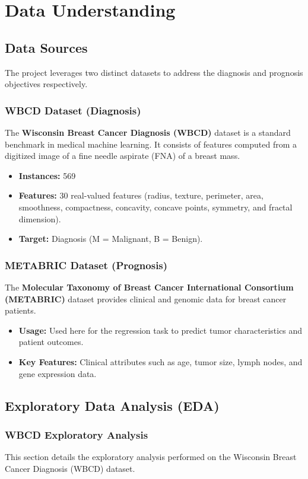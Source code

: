 \chapter{Data Understanding}

\section{Data Sources}
The project leverages two distinct datasets to address the diagnosis and prognosis objectives respectively.

\subsection{WBCD Dataset (Diagnosis)}
The \textbf{Wisconsin Breast Cancer Diagnosis (WBCD)} dataset is a standard benchmark in medical machine learning. It consists of features computed from a digitized image of a fine needle aspirate (FNA) of a breast mass.
\begin{itemize}
    \item \textbf{Instances:} 569
    \item \textbf{Features:} 30 real-valued features (radius, texture, perimeter, area, smoothness, compactness, concavity, concave points, symmetry, and fractal dimension).
    \item \textbf{Target:} Diagnosis (M = Malignant, B = Benign).
\end{itemize}

\subsection{METABRIC Dataset (Prognosis)}
The \textbf{Molecular Taxonomy of Breast Cancer International Consortium (METABRIC)} dataset provides clinical and genomic data for breast cancer patients.
\begin{itemize}
    \item \textbf{Usage:} Used here for the regression task to predict tumor characteristics and patient outcomes.
    \item \textbf{Key Features:} Clinical attributes such as age, tumor size, lymph nodes, and gene expression data.
\end{itemize}

\section{Exploratory Data Analysis (EDA)}

\subsection{WBCD Exploratory Analysis}
This section details the exploratory analysis performed on the Wisconsin Breast Cancer Diagnosis (WBCD) dataset.

